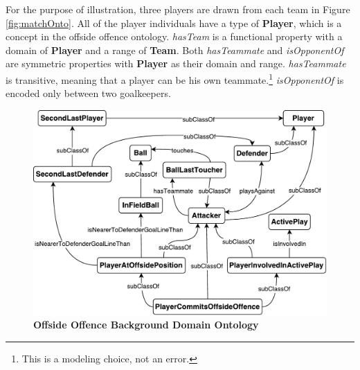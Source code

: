 For the purpose of illustration, three players are drawn from each team in Figure \ref{fig:matchOnto}.
All of the player individuals have a type of \textbf{Player}, which is a concept in the offside offence ontology.
\textit{hasTeam} is a functional property with a domain of \textbf{Player} and a range of \textbf{Team}.
Both \textit{hasTeammate} and \textit{isOpponentOf} are symmetric properties with \textbf{Player} as their domain and range.
\textit{hasTeammate} is transitive, meaning that a player can be his own teammate.\footnote{This is a modeling choice, not an error.}
\textit{isOpponentOf} is encoded only between two goalkeepers.

\begin{figure}[!htbp]
	\centering
	\includegraphics[width=5in]{img/5-soccerOnto}%
	\caption{\textbf{Offside Offence Background Domain Ontology}}
	\label{fig:soccerOnto}
\end{figure}

